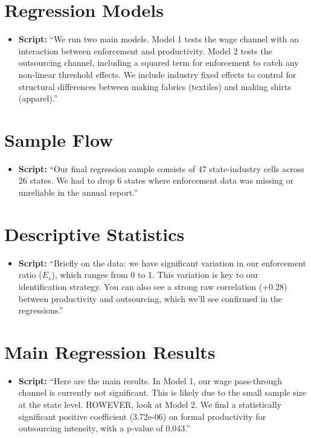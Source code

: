 \documentclass[11pt]{article}
\begin{document}
\section{Regression Models}
\begin{itemize}
    \item \textbf{Script:} ``We run two main models. Model 1 tests the wage channel with an interaction between enforcement and productivity. Model 2 tests the outsourcing channel, including a squared term for enforcement to catch any non-linear threshold effects. We include industry fixed effects to control for structural differences between making fabrics (textiles) and making shirts (apparel).''
\end{itemize}

\section{Sample Flow}
\begin{itemize}
    \item \textbf{Script:} ``Our final regression sample consists of 47 state-industry cells across 26 states. We had to drop 6 states where enforcement data was missing or unreliable in the annual report.''
\end{itemize}

\section{Descriptive Statistics}
\begin{itemize}
    \item \textbf{Script:} ``Briefly on the data: we have significant variation in our enforcement ratio ($E_s$), which ranges from 0 to 1. This variation is key to our identification strategy. You can also see a strong raw correlation (+0.28) between productivity and outsourcing, which we'll see confirmed in the regressions.''
\end{itemize}

\section{Main Regression Results}
\begin{itemize}
    \item \textbf{Script:} ``Here are the main results. In Model 1, our wage pass-through channel is currently not significant. This is likely due to the small sample size at the state level. HOWEVER, look at Model 2. We find a statistically significant positive coefficient (3.72e-06) on formal productivity for outsourcing intensity, with a p-value of 0.043.''
\end{itemize}
\end{document}
